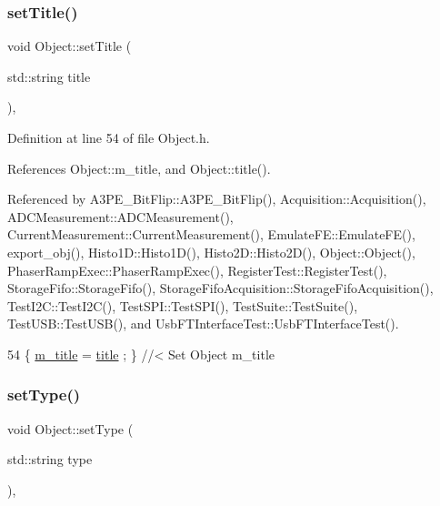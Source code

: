 \subsubsection{\texorpdfstring{set\+Title()}{setTitle()}}
{\footnotesize\ttfamily void Object\+::set\+Title (\begin{DoxyParamCaption}\item[{std\+::string}]{title }\end{DoxyParamCaption})\hspace{0.3cm}{\ttfamily [inline]}, {\ttfamily [inherited]}}



Definition at line 54 of file Object.\+h.



References Object\+::m\+\_\+title, and Object\+::title().



Referenced by A3\+P\+E\+\_\+\+Bit\+Flip\+::\+A3\+P\+E\+\_\+\+Bit\+Flip(), Acquisition\+::\+Acquisition(), A\+D\+C\+Measurement\+::\+A\+D\+C\+Measurement(), Current\+Measurement\+::\+Current\+Measurement(), Emulate\+F\+E\+::\+Emulate\+F\+E(), export\+\_\+obj(), Histo1\+D\+::\+Histo1\+D(), Histo2\+D\+::\+Histo2\+D(), Object\+::\+Object(), Phaser\+Ramp\+Exec\+::\+Phaser\+Ramp\+Exec(), Register\+Test\+::\+Register\+Test(), Storage\+Fifo\+::\+Storage\+Fifo(), Storage\+Fifo\+Acquisition\+::\+Storage\+Fifo\+Acquisition(), Test\+I2\+C\+::\+Test\+I2\+C(), Test\+S\+P\+I\+::\+Test\+S\+P\+I(), Test\+Suite\+::\+Test\+Suite(), Test\+U\+S\+B\+::\+Test\+U\+S\+B(), and Usb\+F\+T\+Interface\+Test\+::\+Usb\+F\+T\+Interface\+Test().


\begin{DoxyCode}
54 \{ \hyperlink{classObject_affbeea1953eb5163573b92fad8f75727}{m\_title} = \hyperlink{classObject_a73a0f1a41828fdd8303dd662446fb6c3}{title} ; \} \textcolor{comment}{//< Set Object m\_title}
\end{DoxyCode}
\mbox{\label{classObject_aae534cc9d982bcb9b99fd505f2e103a5}} 
\subsubsection{\texorpdfstring{set\+Type()}{setType()}}
{\footnotesize\ttfamily void Object\+::set\+Type (\begin{DoxyParamCaption}\item[{std\+::string}]{type }\end{DoxyParamCaption})\hspace{0.3cm}{\ttfamily [inline]}, {\ttfamily [inherited]}}



